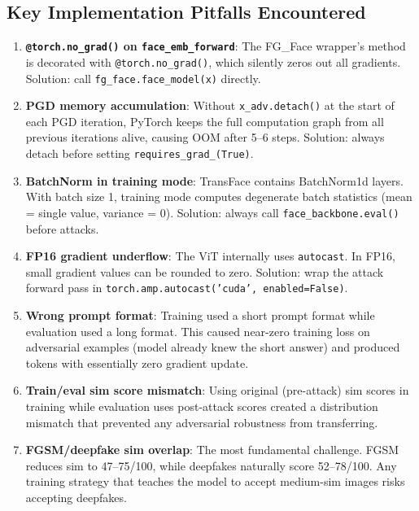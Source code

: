 \documentclass[12pt,a4paper]{article}
\begin{document}
\subsection{Key Implementation Pitfalls Encountered}

\begin{enumerate}
    \item \textbf{\texttt{@torch.no\_grad()} on \texttt{face\_emb\_forward}}: The FG\_Face wrapper's method is decorated with \texttt{@torch.no\_grad()}, which silently zeros out all gradients. Solution: call \texttt{fg\_face.face\_model(x)} directly.

    \item \textbf{PGD memory accumulation}: Without \texttt{x\_adv.detach()} at the start of each PGD iteration, PyTorch keeps the full computation graph from all previous iterations alive, causing OOM after 5--6 steps. Solution: always detach before setting \texttt{requires\_grad\_(True)}.

    \item \textbf{BatchNorm in training mode}: TransFace contains BatchNorm1d layers. With batch size 1, training mode computes degenerate batch statistics (mean = single value, variance = 0). Solution: always call \texttt{face\_backbone.eval()} before attacks.

    \item \textbf{FP16 gradient underflow}: The ViT internally uses \texttt{autocast}. In FP16, small gradient values can be rounded to zero. Solution: wrap the attack forward pass in \texttt{torch.amp.autocast('cuda', enabled=False)}.

    \item \textbf{Wrong prompt format}: Training used a short prompt format while evaluation used a long format. This caused near-zero training loss on adversarial examples (model already knew the short answer) and produced tokens with essentially zero gradient update.

    \item \textbf{Train/eval sim score mismatch}: Using original (pre-attack) sim scores in training while evaluation uses post-attack scores created a distribution mismatch that prevented any adversarial robustness from transferring.

    \item \textbf{FGSM/deepfake sim overlap}: The most fundamental challenge. FGSM reduces sim to 47--75/100, while deepfakes naturally score 52--78/100. Any training strategy that teaches the model to accept medium-sim images risks accepting deepfakes.
\end{enumerate}
\end{document}
